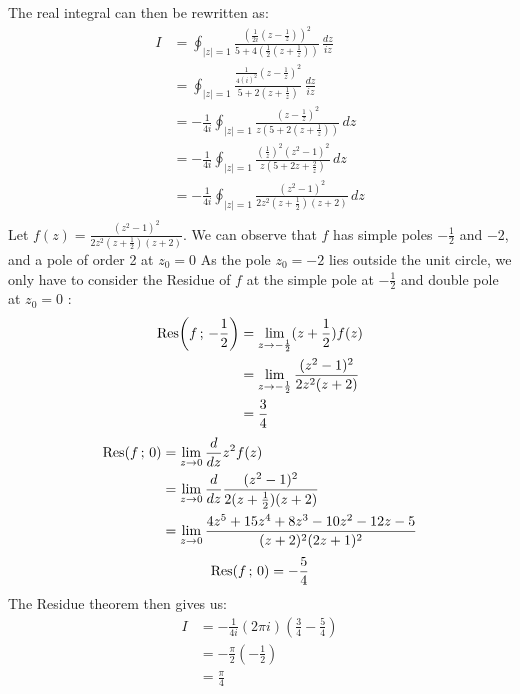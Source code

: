 \documentclass[letterpaper, titlepage, DIV=14]{scrartcl}
\begin{document}
    The real integral can then be rewritten as:
    \begin{align*}
      I &= \oint_{|z|=1} \frac{(\frac{1}{2i}(z-\frac{1}{z}))^{2}}{5+4(\frac{1}{2}(z+\frac{1}{z}))} \, \frac{dz}{iz} \\
        &= \oint_{|z|=1} \frac{\frac{1}{4(i)^{2}}(z-\frac{1}{z})^{2}}{5+2(z+\frac{1}{z})} \, \frac{dz}{iz} \\
        &= -\frac{1}{4i}\oint_{|z|=1} \frac{(z-\frac{1}{z})^{2}}{z(5+2(z+\frac{1}{z}))} \, dz \\
        &= -\frac{1}{4i}\oint_{|z|=1} \frac{(\frac{1}{z})^{2}(z^{2}-1)^{2}}{z(5+2z+\frac{2}{z})} \, dz \\
        &= -\frac{1}{4i}\oint_{|z|=1} \frac{(z^{2}-1)^{2}}{2z^{2}(z+\frac{1}{2})(z+2)} \, dz \\
    \end{align*}
    Let $f(z) = \frac{(z^{2}-1)^{2}}{2z^{2}(z+\frac{1}{2})(z+2)}$. We can observe that $f$ has simple poles $-\frac{1}{2}$ and $-2$, and a pole of order 2 at $z_{0}=0$ As the pole $z_{0}=-2$ lies outside the unit circle, we only have to consider the Residue of $f$ at the simple pole at $-\frac{1}{2}$ and double pole at $z_{0}=0$ :
    \begin{align*}
      \Res(f \, ; \, -\frac{1}{2}) &= \lim_{z\to -\frac{1}{2}}(z+\frac{1}{2})f(z) \\
       &= \lim_{z\to -\frac{1}{2}} \frac{(z^{2}-1)^{2}}{2z^{2}(z+2)} \\
       &= \frac{3}{4}
    \end{align*}
    \begin{align*}
      \Res(f \, ; \, 0) &= \lim_{z\to 0}\frac{d}{dz}z^{2}f(z) \\ 
        &= \lim_{z\to 0} \frac{d}{dz} \frac{(z^{2}-1)^{2}}{2(z+\frac{1}{2})(z+2)} \\
        &= \lim_{z\to 0} \frac{4z^{5}+15z^{4}+8z^{3}-10z^{2}-12z-5}{(z+2)^{2}(2z+1)^{2}}
    \end{align*}
    \begin{equation*}
      \Res(f \, ; \, 0) = -\frac{5}{4}
    \end{equation*}
    The Residue theorem then gives us:
    \begin{align*}
      I &= -\frac{1}{4i}(2\pi i)(\frac{3}{4} - \frac{5}{4}) \\
      &= -\frac{\pi}{2}(-\frac{1}{2}) \\
      &= \frac{\pi}{4}
    \end{align*}
\end{document}
